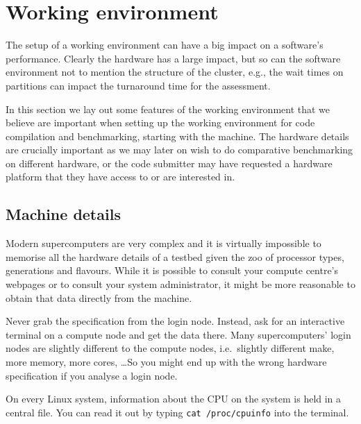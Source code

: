 \section{Working environment}
\label{section:preparation:environment}
  
The setup of a working environment can have a big impact on a software's performance. Clearly the hardware has a large impact, but so can the software environment not to mention the structure of the cluster, e.g., the wait times on partitions can impact the turnaround time for the assessment.

In this section we lay out some features of the working environment that we believe are important when setting up the working environment for code compilation and benchmarking, starting with the machine. The hardware details are crucially important as we may later on wish to do comparative benchmarking on different hardware, or the code submitter may have requested a hardware platform that they have access to or are interested in.

\subsection{Machine details}
\label{subsection:preparation:machine}

Modern supercomputers are very complex and it is virtually impossible to
memorise all the hardware details of a testbed given the zoo of processor types,
generations and flavours.
While it is possible to consult your compute centre's webpages or to consult
your system administrator, it might be more reasonable to obtain that data
directly from the machine.

\begin{assessmentcrime}
 Never grab the specification from the login node. Instead, ask for an
 interactive terminal on a compute node and get the data there. Many
 supercomputers' login nodes are slightly different to the compute nodes,
 i.e.~slightly different make, more memory, more cores, \ldots So you might end
 up with the wrong hardware specification if you analyse a login node.
\end{assessmentcrime}

\begin{instructions}{\linux}
 On every Linux system, information about the CPU on the system is held in a
 central file.
 You can read it out by typing \texttt{cat /proc/cpuinfo} into the terminal.
\end{instructions}


